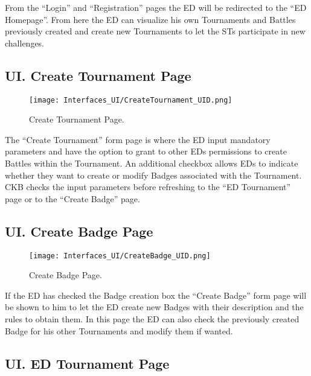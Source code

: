 From the “Login” and “Registration” pages the ED will be redirected to the “ED Homepage”. From here the ED can visualize his own Tournaments and Battles previously created and create new Tournaments to let the STs participate in new challenges.

\subsection*{UI\cui . Create Tournament Page}

\begin{figure}[H]
    \begin{center}
        \texttt{[image: Interfaces\_UI/CreateTournament\_UID.png]}
        \caption{Create Tournament Page.}
        \label{fig:create_tournament_page}%
    \end{center}
\end{figure}

The “Create Tournament” form page is where the ED  input mandatory parameters and have the option to grant to other EDs permissions to create Battles within the Tournament. An additional checkbox allows EDs to indicate whether they want to create or modify Badges associated with the Tournament. CKB checks the input parameters before refreshing to the “ED Tournament” page or to the “Create Badge” page.

\subsection*{UI\cui . Create Badge Page}

\begin{figure}[H]
    \begin{center}
        \texttt{[image: Interfaces\_UI/CreateBadge\_UID.png]}
        \caption{Create Badge Page.}
        \label{fig:create_badge_page}%
    \end{center}
\end{figure}

If the ED has checked the Badge creation box the “Create Badge” form page will be shown to him to let the ED create new Badges with their description and the rules to obtain them. In this page the ED can also check the previously created Badge for his other Tournaments and modify them if wanted.

\subsection*{UI\cui . ED Tournament Page}

